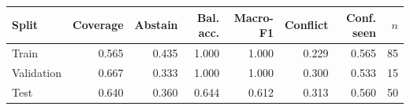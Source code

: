 \setcounter{table}{4}\label{tab:rulebook_performance}
\begin{tabular}{lrrrrrrr}
\toprule
Split & Coverage & Abstain & Bal. acc. & Macro-F1 & Conflict & Conf. seen & \(n\) \\
\midrule
Train & 0.565 & 0.435 & 1.000 & 1.000 & 0.229 & 0.565 & 85 \\
Validation & 0.667 & 0.333 & 1.000 & 1.000 & 0.300 & 0.533 & 15 \\
Test & 0.640 & 0.360 & 0.644 & 0.612 & 0.313 & 0.560 & 50 \\
\bottomrule
\end{tabular}
